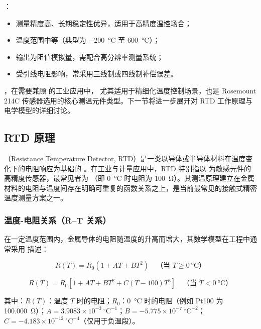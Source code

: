 ：
\begin{itemize}
\item 测量精度高、长期稳定性优异，适用于高精度温控场合；
\item 温度范围中等（典型为 \SI{-200}{\degreeCelsius} 至 \SI{+600}{\degreeCelsius}）；
\item 输出为阻值模拟量，需配合高分辨率测量系统；
\item 受引线电阻影响，常采用三线制或四线制补偿误差。
\end{itemize}

\vspace{0.5em}

\noindent{}，在需要兼顾  的工业应用中， 尤其适用于精细化温度控制场景，也是 Rosemount 214C 传感器选用的核心测温元件类型。下一节将进一步展开对 RTD 工作原理与电学模型的详细讨论。

\subsection{RTD 原理}

（Resistance Temperature Detector, RTD）是一类以导体或半导体材料在温度变化下的电阻响应为基础的 。在工业与计量应用中，RTD 特别指以  为敏感元件的高精度传感器，最常见者为 （即 \SI{0}{\degreeCelsius} 时电阻为 \SI{100}{\ohm}）。其测温原理建立在金属材料的电阻与温度间存在明确可重复的函数关系之上，是当前最常见的接触式精密温度测量方案之一。

\subsubsection{温度-电阻关系（R--T 关系）}

在一定温度范围内，金属导体的电阻随温度的升高而增大，其数学模型在工程中通常采用  描述：

\begin{equation}
	R(T) = R_0 (1 + AT + BT^2) \quad \text{（当 } T \geq \SI{0}{\degreeCelsius} \text{）}
\end{equation}

\begin{equation}
	R(T) = R_0 [1 + AT + BT^2 + C(T - 100)T^3] \quad \text{（当 } T < \SI{0}{\degreeCelsius} \text{）}
\end{equation}

其中：$R(T)$：温度 $T$ 时的电阻；$R_0$：\SI{0}{\degreeCelsius} 时的电阻（例如 Pt100 为 \SI{100.000}{\ohm}）；$A = 3.9083 \times 10^{-3}~{}^\circ\mathrm{C}^{-1}$；$B = -5.775 \times 10^{-7}~{}^\circ\mathrm{C}^{-2}$；$C = -4.183 \times 10^{-12}~{}^\circ\mathrm{C}^{-4}$（仅用于负温段）。

